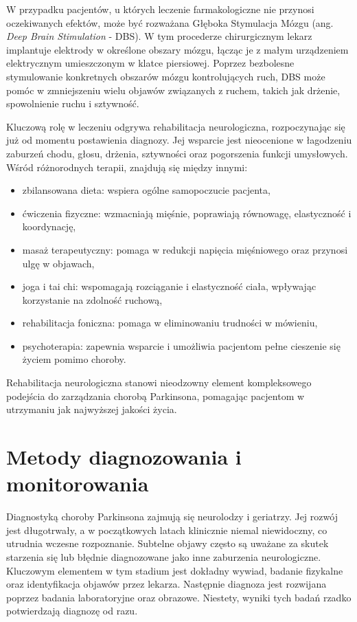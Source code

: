 W przypadku pacjentów, u których leczenie farmakologiczne nie przynosi oczekiwanych efektów, może być rozważana Głęboka Stymulacja Mózgu (ang. \emph{Deep Brain Stimulation} - DBS).
W tym procederze chirurgicznym lekarz implantuje elektrody w określone obszary mózgu, łącząc je z małym urządzeniem elektrycznym umieszczonym w klatce piersiowej.
Poprzez bezbolesne stymulowanie konkretnych obszarów mózgu kontrolujących ruch, DBS może pomóc w zmniejszeniu wielu objawów związanych z ruchem,
takich jak drżenie, spowolnienie ruchu i sztywność.

Kluczową rolę w leczeniu odgrywa rehabilitacja neurologiczna, rozpoczynając się już od momentu postawienia diagnozy.
Jej wsparcie jest nieocenione w łagodzeniu zaburzeń chodu, głosu, drżenia, sztywności oraz pogorszenia funkcji umysłowych.
Wśród różnorodnych terapii, znajdują się między innymi:
\begin{itemize}[itemsep=0.1pt]
	\item zbilansowana dieta: wspiera ogólne samopoczucie pacjenta,
	\item ćwiczenia fizyczne: wzmacniają mięśnie, poprawiają równowagę, elastyczność i koordynację,
	\item masaż terapeutyczny: pomaga w redukcji napięcia mięśniowego oraz przynosi ulgę w objawach,
	\item joga i tai chi: wspomagają rozciąganie i elastyczność ciała, wpływając korzystanie na zdolność ruchową,
	\item rehabilitacja foniczna: pomaga w eliminowaniu trudności w mówieniu,
	\item psychoterapia: zapewnia wsparcie i umożliwia pacjentom pełne cieszenie się życiem pomimo choroby.
\end{itemize}

Rehabilitacja neurologiczna stanowi nieodzowny element kompleksowego podejścia do zarządzania chorobą Parkinsona, pomagając pacjentom w utrzymaniu jak najwyższej jakości życia.


\section{Metody diagnozowania i monitorowania}
\label{subsec:diagnostyka}

Diagnostyką choroby Parkinsona zajmują się neurolodzy i geriatrzy.
Jej rozwój jest długotrwały, a w początkowych latach klinicznie niemal niewidoczny, co utrudnia wczesne rozpoznanie.
Subtelne objawy często są uważane za skutek starzenia się lub błędnie diagnozowane jako inne zaburzenia neurologiczne.
Kluczowym elementem w tym stadium jest dokładny wywiad, badanie fizykalne oraz identyfikacja objawów przez lekarza.
Następnie diagnoza jest rozwijana poprzez badania laboratoryjne  oraz obrazowe.
Niestety, wyniki tych badań rzadko potwierdzają diagnozę od razu.

